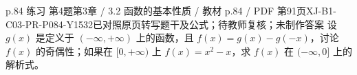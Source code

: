 \par\noindent\begin{minipage}{\linewidth}
\begin{bankitem}{p.84 练习 第4题}{第3章 / 3.2 函数的基本性质 / 教材 p.84 / PDF 第91页}{XJ-B1-C03-PR-P084-Y1532}{已对照原页转写题干及公式；待教师复核；未制作答案}
设 $g(x)$ 是定义于 $(-\infty,+\infty)$ 上的函数，且 $f(x)=g(x)-g(-x)$，讨论 $f(x)$ 的奇偶性；如果在 $[0,+\infty)$ 上 $f(x)=x^2-x$，求 $f(x)$ 在 $(-\infty,0]$ 上的解析式。
\end{bankitem}
\end{minipage}\par\medskip
